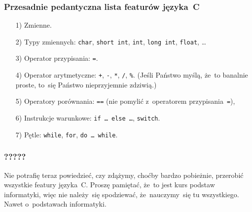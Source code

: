 \documentclass[10pt,t]{beamer}
\begin{document}
\begin{frame}
  \frametitle{Przesadnie pedantyczna lista featurów języka~C}


  \begin{itemize}

  \item[1)] Zmienne.

  \item[2)] Typy zmiennych: \texttt{char}, \texttt{short int}, \texttt{int},
    \texttt{long int}, \texttt{float}, \ldots

  \item[3)] Operator przypisania: \texttt{=}.

  \item[4)] Operator arytmetyczne: \texttt{+}, \texttt{-}, \texttt{*},
    \texttt{/}, \texttt{\%}.
    (Jeśli Państwo myślą, że~to banalnie proste, to~się Państwo
    nieprzyjemnie zdziwią.)

  \item[5)] Operatory porównania: \texttt{==} (nie pomylić z~operatorem
    przypisania~\texttt{=}),



  \item[6)] Instrukcje warunkowe: \texttt{if \ldots{} else \ldots}, \texttt{switch}.



  \item[7)] Pętle: \texttt{while}, \texttt{for}, \texttt{do \ldots{} while}.

  \end{itemize}

\end{frame}





\begin{frame}
  \frametitle{?????}


  Nie potrafię teraz powiedzieć, czy zdążymy, choćby bardzo pobieżnie,
  przerobić \alert{wszystkie} featury języka~C. Proszę pamiętać, że~to jest
  kurs \alert{podstaw informatyki}, więc nie należy~się spodziewać,
  że~nauczymy~się tu wszystkiego. Nawet o~podstawach informatyki.

\end{frame}
\end{document}

